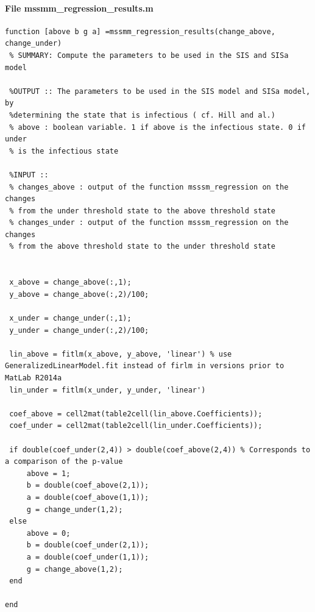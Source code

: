 \documentclass[11pt]{article}
\begin{document}
\paragraph{File mssmm\_regression\_results.m}
\begin{verbatim}
function [above b g a] =mssmm_regression_results(change_above, change_under)
 % SUMMARY: Compute the parameters to be used in the SIS and SISa model
 
 %OUTPUT :: The parameters to be used in the SIS model and SISa model, by
 %determining the state that is infectious ( cf. Hill and al.)
 % above : boolean variable. 1 if above is the infectious state. 0 if under
 % is the infectious state
 
 %INPUT ::
 % changes_above : output of the function msssm_regression on the changes
 % from the under threshold state to the above threshold state
 % changes_under : output of the function msssm_regression on the changes
 % from the above threshold state to the under threshold state
 
 
 x_above = change_above(:,1);
 y_above = change_above(:,2)/100;
 
 x_under = change_under(:,1);
 y_under = change_under(:,2)/100;
 
 lin_above = fitlm(x_above, y_above, 'linear') % use GeneralizedLinearModel.fit instead of firlm in versions prior to MatLab R2014a
 lin_under = fitlm(x_under, y_under, 'linear')
    
 coef_above = cell2mat(table2cell(lin_above.Coefficients));
 coef_under = cell2mat(table2cell(lin_under.Coefficients));
 
 if double(coef_under(2,4)) > double(coef_above(2,4)) % Corresponds to a comparison of the p-value
     above = 1;
     b = double(coef_above(2,1));
     a = double(coef_above(1,1));
     g = change_under(1,2);
 else
     above = 0;
     b = double(coef_under(2,1));
     a = double(coef_under(1,1));
     g = change_above(1,2);
 end

end

\end{verbatim}
\end{document}
